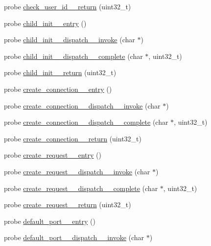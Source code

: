 \begin{DoxyCompactItemize}
\item 
probe \hyperlink{apache__probes_8d_af34cc8b92115c48f4b65b5db3806cadc}{check\+\_\+user\+\_\+id\+\_\+\+\_\+return} (uint32\+\_\+t)
\item 
probe \hyperlink{apache__probes_8d_aae8c848faeb4d03b824ec0f2e4f6f915}{child\+\_\+init\+\_\+\+\_\+entry} ()
\item 
probe \hyperlink{apache__probes_8d_a867132b91a34eff54c2770c43e430bce}{child\+\_\+init\+\_\+\+\_\+dispatch\+\_\+\+\_\+invoke} (char $\ast$)
\item 
probe \hyperlink{apache__probes_8d_af2c67d95e73584848d2c0ae8c03bc80c}{child\+\_\+init\+\_\+\+\_\+dispatch\+\_\+\+\_\+complete} (char $\ast$, uint32\+\_\+t)
\item 
probe \hyperlink{apache__probes_8d_ac7941b0e2671f46d775823633df64f93}{child\+\_\+init\+\_\+\+\_\+return} (uint32\+\_\+t)
\item 
probe \hyperlink{apache__probes_8d_a828a65588e3d2d016c4aaeab6984bae6}{create\+\_\+connection\+\_\+\+\_\+entry} ()
\item 
probe \hyperlink{apache__probes_8d_a689e7ffef86fe3bb9e5bc85d2e55bbc4}{create\+\_\+connection\+\_\+\+\_\+dispatch\+\_\+\+\_\+invoke} (char $\ast$)
\item 
probe \hyperlink{apache__probes_8d_a41c47146615f8dd8651ef30f6c69d17e}{create\+\_\+connection\+\_\+\+\_\+dispatch\+\_\+\+\_\+complete} (char $\ast$, uint32\+\_\+t)
\item 
probe \hyperlink{apache__probes_8d_ab3ec7dbaafa6effadc993f8f03106b64}{create\+\_\+connection\+\_\+\+\_\+return} (uint32\+\_\+t)
\item 
probe \hyperlink{apache__probes_8d_a085060e4a70e93488c2683e319e1e6f1}{create\+\_\+request\+\_\+\+\_\+entry} ()
\item 
probe \hyperlink{apache__probes_8d_a55a2dd1b8c15c18b2d65c30ac6bd6440}{create\+\_\+request\+\_\+\+\_\+dispatch\+\_\+\+\_\+invoke} (char $\ast$)
\item 
probe \hyperlink{apache__probes_8d_a46ba90de321099059eed8d3a950f83bb}{create\+\_\+request\+\_\+\+\_\+dispatch\+\_\+\+\_\+complete} (char $\ast$, uint32\+\_\+t)
\item 
probe \hyperlink{apache__probes_8d_a4752b94ae0f538466d6b87efcdfa15ed}{create\+\_\+request\+\_\+\+\_\+return} (uint32\+\_\+t)
\item 
probe \hyperlink{apache__probes_8d_a6c6fc151c3853511bbe4d7abdbb3bb68}{default\+\_\+port\+\_\+\+\_\+entry} ()
\item 
probe \hyperlink{apache__probes_8d_a3b44783c338e6c355ecce85957084aac}{default\+\_\+port\+\_\+\+\_\+dispatch\+\_\+\+\_\+invoke} (char $\ast$)

\end{DoxyCompactItemize}
